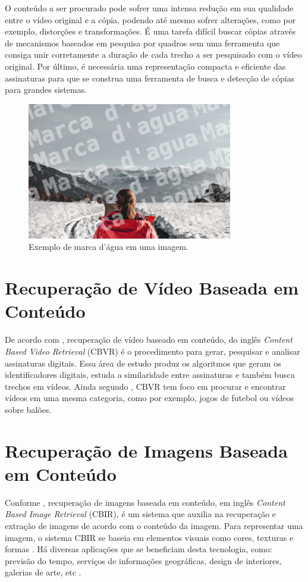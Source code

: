     O conteúdo a ser procurado pode sofrer uma intensa redução em sua qualidade entre o vídeo original e a cópia, podendo até mesmo sofrer alterações, como por exemplo, distorções e transformações. É uma tarefa difícil buscar cópias através de mecanismos baseados em pesquisa por quadros sem uma ferramenta que consiga unir corretamente a duração de cada trecho a ser pesquisado com o vídeo original. Por último, é necessária uma representação compacta e eficiente das assinaturas para que se construa uma ferramenta de busca e detecção de cópias para grandes sistemas.
    
    	\begin{figure}[h]
        \centering
        \includegraphics[width=0.8\textwidth]{dados/figuras/marca_dagua.png}
        \caption{Exemplo de marca d'água em uma imagem.}
    	\label{fig:marcadagua}
    \end{figure}

\section{Recuperação de Vídeo Baseada em Conteúdo}
De acordo com \citeauthor{law2007video}, recuperação de vídeo baseado em conteúdo, do inglês \textit{Content Based Video Retrieval} (CBVR) é o procedimento para gerar, pesquisar e analisar assinaturas digitais. Essa área de estudo produz os algoritmos que geram os identificadores digitais, estuda a similaridade entre assinaturas e também busca trechos em vídeos. Ainda segundo \citeauthor{law2007video}, CBVR tem foco em procurar e encontrar vídeos em uma mesma categoria, como por exemplo, jogos de futebol ou vídeos sobre balões.

\section{Recuperação de Imagens Baseada em Conteúdo}
Conforme \citeauthor{gudivada1995content}, recuperação de imagens baseada em conteúdo, em inglês \textit{Content Based Image Retrieval} (CBIR), é um sistema que auxilia na recuperação e extração de imagens de acordo com o conteúdo da imagem. Para representar uma imagem, o sistema CBIR se baseia em elementos visuais como cores, texturas e formas \citeauthor{vikhar2016improved}. Há diversas aplicações que se beneficiam desta tecnologia, como: previsão do tempo, serviços de informações geográficas, design de interiores, galerias de arte, etc \citeauthor{gudivada1995content}.

